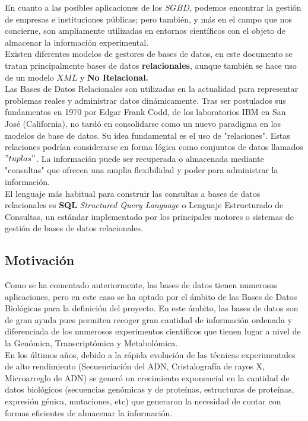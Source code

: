 \documentclass[12pt,a4paper]{article}
\begin{document}
En cuanto a las posibles aplicaciones de los $SGBD$, podemos encontrar la gestión de empresas e instituciones públicas; pero también, y más en el campo que nos concierne, son ampliamente utilizadas en entornos científicos con el objeto de almacenar la información experimental.\\

Existen diferentes modelos de gestores de bases de datos, en este documento se tratan principalmente bases de datos \textbf{relacionales}, aunque también se hace uso de un modelo $XML$ y \textbf{No Relacional.}\\

Las Bases de Datos Relacionales son utilizadas en la actualidad para representar problemas reales y administrar datos dinámicamente. Tras ser postulados sus fundamentos en 1970 por Edgar Frank Codd, de los laboratorios IBM en San José (California), no tardó en consolidarse como un nuevo paradigma en los modelos de base de datos. Su idea fundamental es el uso de "relaciones". Estas relaciones podrían considerarse en forma lógica como conjuntos de datos llamados $"tuplas"$. La información puede ser recuperada o almacenada mediante "consultas" que ofrecen una amplia flexibilidad y poder para administrar la información.\\
\newpage
El lenguaje más habitual para construir las consultas a bases de datos relacionales es \textbf{SQL} \textit{Structured Query Language} o Lenguaje Estructurado de Consultas, un estándar implementado por los principales motores o sistemas de gestión de bases de datos relacionales.


\subsection{Motivación} \label{pto12}

Como se ha comentado anteriormente, las bases de datos tienen numerosas aplicaciones, pero en este caso se ha optado por el ámbito de las Bases de Datos Biológicas para la definición del proyecto. En este ámbito, las bases de datos son de gran ayuda pues permiten recoger gran cantidad de información ordenada y diferenciada de los numerosos experimentos científicos que tienen lugar a nivel de la Genómica, Transcriptómica y Metabolómica.\\

En los últimos años, debido a la rápida evolución de las técnicas experimentales de alto rendimiento (Secuenciación del ADN, Cristalografía de rayos X, Microarreglo de ADN) se generó un crecimiento exponencial en la cantidad de datos biológicos (secuencias genómicas y de proteínas, estructuras de proteínas, expresión génica, mutaciones, etc) que generaron la necesidad de contar con formas eficientes de almacenar la información.\\
\end{document}
